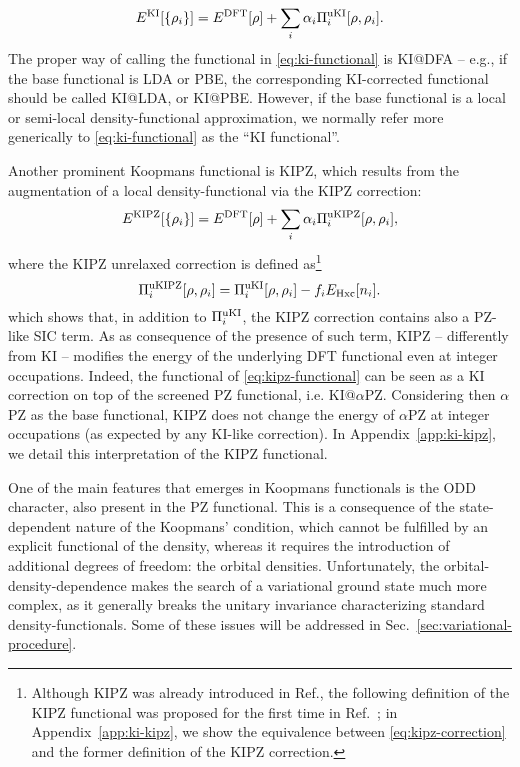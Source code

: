 %
\begin{equation}
    E^{\rm KI}[\{\rho_i\}] = E^{\rm DFT}[\rho] + \sum_i \alpha_i \Pi_i^{\rm uKI}[\rho, \rho_i] .
    \label{eq:ki-functional}
\end{equation}
%
The proper way of calling the functional in \cref{eq:ki-functional} is KI@DFA -- e.g., if the base functional is LDA or PBE, the corresponding KI-corrected functional should be called KI@LDA, or KI@PBE. However, if the base functional is a local or semi-local density-functional approximation, we normally refer more generically to \cref{eq:ki-functional} as the ``KI functional''.

Another prominent Koopmans functional is KIPZ, which results from the augmentation of a local density-functional via the KIPZ correction:
%
\begin{equation}
    E^{\rm KIPZ}[\{\rho_i\}] = E^{\rm DFT}[\rho] + \sum_i \alpha_i \Pi_i^{\rm uKIPZ}[\rho, \rho_i] ,
    \label{eq:kipz-functional}
\end{equation}
%
where the KIPZ unrelaxed correction is defined as\footnote{Although KIPZ was already introduced in Ref.\cite{borghi_koopmans-compliant_2014}, the following definition of the KIPZ functional was proposed for the first time in Ref.~\cite{borghi_variational_2015}; in Appendix~\ref{app:ki-kipz}, we show the equivalence between \cref{eq:kipz-correction} and the former definition of the KIPZ correction.}
%
\begin{equation}
    \Pi_i^{\rm uKIPZ}[\rho,\rho_i] = \Pi_i^{\rm uKI}[\rho,\rho_i] - f_i E_{\rm Hxc}[n_i] .
    \label{eq:kipz-correction}
\end{equation}
%
which shows that, in addition to $\Pi_i^{\rm uKI}$, the KIPZ correction contains also a PZ-like SIC term. As as consequence of the presence of such term, KIPZ -- differently from KI -- modifies the energy of the underlying DFT functional even at integer occupations. Indeed, the functional of \cref{eq:kipz-functional} can be seen as a KI correction on top of the screened PZ functional, i.e. KI@$\alpha$PZ. Considering then $\alpha$PZ as the base functional, KIPZ does not change the energy of $\alpha$PZ at integer occupations (as expected by any KI-like correction). In Appendix~\ref{app:ki-kipz}, we detail this interpretation of the KIPZ functional.

One of the main features that emerges in Koopmans functionals is the ODD character, also present in the PZ functional. This is a consequence of the state-dependent nature of the Koopmans' condition, which cannot be fulfilled by an explicit functional of the density, whereas it requires the introduction of additional degrees of freedom: the orbital densities. Unfortunately, the orbital-density-dependence makes the search of a variational ground state much more complex, as it generally breaks the unitary invariance characterizing standard density-functionals. Some of these issues will be addressed in Sec.~\ref{sec:variational-procedure}.

